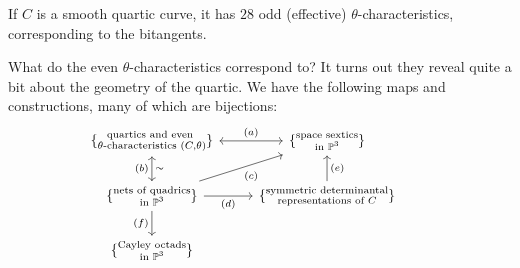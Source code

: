 \documentclass[11pt]{amsart}
\begin{document}
\begin{example} If $C$ is a smooth quartic curve, it has $28$ odd (effective) $\theta$-characteristics, corresponding to the bitangents.
\end{example}

What do the even $\theta$-characteristics correspond to? It turns out they reveal quite a bit about the geometry of the quartic. We have the following maps and constructions, many of which are bijections:
\[ \begin{tikzcd}
    {\{\substack{\text{quartics and even } \\\theta\text{-characteristics }(C,\theta) }\}}\dar[<->,"\sim" right,"(b)" left]\rar[<->,"(a)"] & {\{\substack{\text{space sextics} \\ \text{in } \P^3}\}} & \\
    {\{\substack{\text{nets of quadrics}\\\text{in }\P^3}\}} \rar["(d)" below]\ar[ur,"(c)" below right]\dar["(f)" left] & {\{\substack{\text{symmetric determinantal}\\\text{representations of }C}\}}\uar["(e)" right] \\
    {\{\substack{\text{Cayley octads} \\ \text{in }\P^3}\}}
\end{tikzcd} \]
\end{document}

